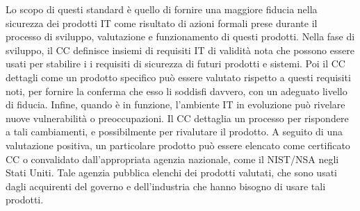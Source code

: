 \singlespacing

Lo scopo di questi standard è quello di fornire una maggiore fiducia nella sicurezza dei prodotti IT come risultato di azioni formali prese durante il processo di sviluppo, valutazione e funzionamento di questi prodotti. Nella fase di sviluppo, il CC definisce insiemi di requisiti IT di validità nota che possono essere usati per stabilire i i requisiti di sicurezza di futuri prodotti e sistemi. Poi il CC dettagli come un prodotto specifico può essere valutato rispetto a questi requisiti noti, per fornire la conferma che esso li soddisfi davvero, con un adeguato livello di fiducia. Infine, quando è in funzione, l'ambiente IT in evoluzione può rivelare nuove vulnerabilità o preoccupazioni. Il CC dettaglia un processo per rispondere a tali cambiamenti, e possibilmente per rivalutare il prodotto. A seguito di una valutazione positiva, un particolare prodotto può essere elencato come certificato CC o convalidato dall'appropriata agenzia nazionale, come il NIST/NSA negli Stati Uniti. Tale agenzia pubblica elenchi dei prodotti valutati, che sono usati dagli acquirenti del governo e dell'industria che hanno bisogno di usare tali prodotti.
\newpage

